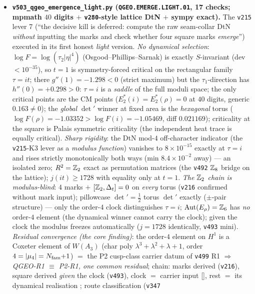 \begin{itemize}[leftmargin=1.5em]
\item \textbf{\texttt{v503\_qgeo\_emergence\_light.py} (\texttt{QGEO.EMERGE.LIGHT.01}, 17 checks;
mpmath $40$ digits $+$ \texttt{v280}-style lattice DtN $+$ sympy exact).} The \texttt{v215} lever 7
(``the decisive kill is deferred: compute the raw seam-collar DtN \emph{without} inputting the marks
and check whether four square marks \emph{emerge}'') executed in its first honest \emph{light}
version. \emph{No dynamical selection}: $\log F=\log(\tau_2|\eta|^4)$ (Osgood--Phillips--Sarnak) is
exactly $S$-invariant (dev $<10^{-35}$), so $t{=}1$ is symmetry-forced critical on the rectangular
family $\tau=it$; there $g''(1)=-1.298<0$ (strict maximum) but the $\tau_1$-direction has
$h''(0)=+0.298>0$: $\tau{=}i$ is a \emph{saddle} of the full moduli space; the only critical points
are the CM points ($E_2^*(i)=E_2^*(\rho)=0$ at $40$ digits, generic $0.163\neq0$); the \emph{global}
$\det{}'$ winner at fixed area is the \emph{hexagonal} torus ($\log F(\rho)=-1.03352>\log
F(i)=-1.05469$, diff $0.021169$); criticality at the square is Palais symmetric criticality (the
independent heat trace is equally critical). \emph{Sharp rigidity}: the DtN mod-$4$ off-character
indicator (the \texttt{v215}-K3 lever as a \emph{modulus function}) vanishes to $8\times10^{-15}$
exactly at $\tau{=}i$ and rises strictly monotonically both ways (min $8.4\times10^{-2}$ away) ---
an isolated zero; $R^2=\mathbb{Z}_2$ exact as permutation matrices (the \texttt{v492} $\mathbb{Z}_8$ bridge on the
lattice); $j(it)\ge1728$ with equality only at $t{=}1$. \emph{The $\mathbb{Z}_2$ chain is modulus-blind}:
$4$ marks $+$ $[\mathbb{Z}_2,\Delta_t]=0$ on \emph{every} torus (\texttt{v216} confirmed without mark
input); pillowcase $\det{}'=\tfrac12$ torus $\det{}'$ exactly ($\pm$-pair structure) --- only the
order-$4$ clock distinguishes $\tau{=}i$; $\mathrm{Aut}(E_\rho)=\mathbb{Z}_6$ has \emph{no} order-$4$
element (the dynamical winner cannot carry the clock); given the clock the modulus freezes
automatically ($j=1728$ identically, \texttt{v493} mini). \emph{Residual convergence (the core
finding)}: the order-$4$ element on $H^1$ is a Coxeter element of $W(A_3)$ (char poly
$\lambda^3{+}\lambda^2{+}\lambda{+}1$, order $4=|\mu_4|=N_{\mathrm{fam}}{+}1$) $=$ the P2 cusp-class carrier
datum of \texttt{v499} R1 $\Rightarrow$ \emph{QGEO-R1 $\equiv$ P2-R1, one common residual}; chain:
marks derived (\texttt{v216}), square derived \emph{given} the clock (\texttt{v493}), clock $=$
carrier input [\mC], rest $=$ its dynamical realisation \mO; route classification (\texttt{v347}

\end{itemize}
